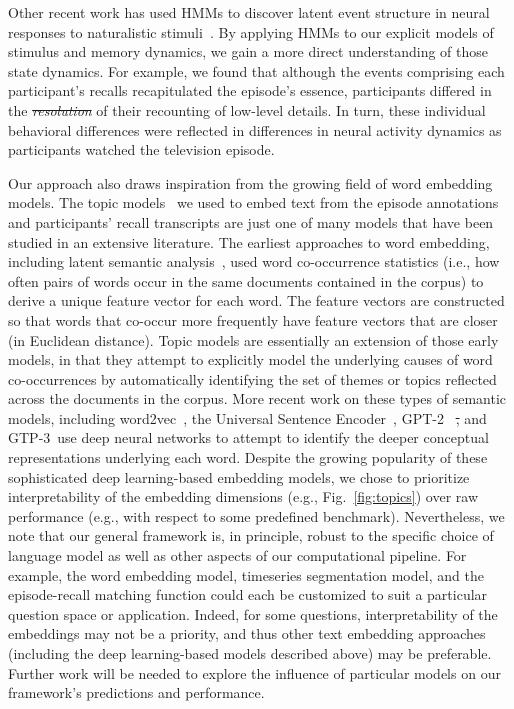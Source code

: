 \documentclass[10pt]{article}
\renewcommand{\includegraphics}[2][]{} %
\providecommand{\DIFaddtex}[1]{{\protect\color{blue}\uwave{#1}}} %
\providecommand{\DIFdeltex}[1]{{\protect\color{red}\sout{#1}}}                      %
\providecommand{\DIFaddbegin}{} %
\providecommand{\DIFaddend}{} %
\providecommand{\DIFdelbegin}{} %
\providecommand{\DIFdelend}{} %
\providecommand{\DIFadd}[1]{\texorpdfstring{\DIFaddtex{#1}}{#1}} %
\providecommand{\DIFdel}[1]{\texorpdfstring{\DIFdeltex{#1}}{}} %
\newcommand{\DIFscaledelfig}{0.5}
\newlength{\DIFdelgraphicswidth} %
\newlength{\DIFdelgraphicsheight} %
\newcommand{\DIFaddincludegraphics}[2][]{{\color{blue}\fbox{\DIFOincludegraphics[#1]{#2}}}} %
\newcommand{\DIFdelincludegraphics}[2][]{%
\sbox{\DIFdelgraphicsbox}{\DIFOincludegraphics[#1]{#2}}%
\settoboxwidth{\DIFdelgraphicswidth}{\DIFdelgraphicsbox} %
\settoboxtotalheight{\DIFdelgraphicsheight}{\DIFdelgraphicsbox} %
\scalebox{\DIFscaledelfig}{%
\parbox[b]{\DIFdelgraphicswidth}{\usebox{\DIFdelgraphicsbox}\\[-\baselineskip] \rule{\DIFdelgraphicswidth}{0em}}\llap{\resizebox{\DIFdelgraphicswidth}{\DIFdelgraphicsheight}{%
\setlength{\unitlength}{\DIFdelgraphicswidth}%
\begin{picture}(1,1)%
\thicklines\linethickness{2pt} %
{\color[rgb]{1,0,0}\put(0,0){\framebox(1,1){}}}%
{\color[rgb]{1,0,0}\put(0,0){\line( 1,1){1}}}%
{\color[rgb]{1,0,0}\put(0,1){\line(1,-1){1}}}%
\end{picture}%
}\hspace*{3pt}}} %
} %
\DeclareRobustCommand{\DIFaddbegin}{\DIFOaddbegin \let\includegraphics\DIFaddincludegraphics} %
\DeclareRobustCommand{\DIFaddend}{\DIFOaddend \let\includegraphics\DIFOincludegraphics} %
\DeclareRobustCommand{\DIFdelbegin}{\DIFOdelbegin \let\includegraphics\DIFdelincludegraphics} %
\DeclareRobustCommand{\DIFdelend}{\DIFOaddend \let\includegraphics\DIFOincludegraphics} %
\begin{document}
Other recent work has used HMMs to discover latent event structure in neural responses to naturalistic stimuli~\citep{BaldEtal17}.  By applying HMMs to our explicit models of stimulus and memory dynamics, we gain a more direct understanding of those state dynamics.  For example, we found that although the events comprising each participant's recalls recapitulated the episode's essence, participants differed in the \DIFdelbegin \textit{\DIFdel{resolution}} %
\DIFdelend \DIFaddbegin \DIFadd{resolution }\DIFaddend of their recounting of low-level details.  In turn, these individual behavioral differences were reflected in differences in neural activity dynamics as participants watched the television episode.

Our approach also draws inspiration from the growing field of word embedding models.  The topic models~\citep{BleiEtal03} we used to embed text from the episode annotations and participants' recall transcripts are just one of many models that have been studied in an extensive literature.  The earliest approaches to word embedding, including latent
semantic analysis~\citep{LandDuma97}, used word co-occurrence statistics (i.e., how often pairs of words occur in the same documents contained in the corpus) to derive a unique feature vector for each word.  The feature vectors are constructed so that words that co-occur more frequently have feature vectors that are closer (in Euclidean distance).  Topic models are essentially an extension of those early models, in that they attempt to explicitly model the underlying causes of word co-occurrences by automatically identifying the set of themes or topics reflected across the documents in the corpus.  More recent work on these types of semantic models, including word2vec~\citep{MikoEtal13a}, the Universal Sentence Encoder~\citep{CerEtal18}, \DIFaddbegin \DIFadd{and Generative Pre-trained Transformers (e.g., }\DIFaddend GPT-2~\citep{RadfEtal19} \DIFdelbegin \DIFdel{, }\DIFdelend and GTP-3~\citep{BrowEtal20}\DIFaddbegin \DIFadd{) }\DIFaddend use deep neural networks to attempt to identify the deeper conceptual representations underlying each word.  Despite the growing popularity of these sophisticated deep learning-based embedding models, we chose to prioritize interpretability of the embedding dimensions (e.g., Fig.~\ref{fig:topics}) over raw performance (e.g., with respect to some predefined benchmark).  Nevertheless, we note that our general framework is, in principle, robust to the specific choice of language model as well as other aspects of our computational pipeline.  For example, the word embedding model, timeseries segmentation model, and the episode-recall matching function could each be customized to suit a particular question space or application.  Indeed, for some questions, interpretability of the embeddings may not be a priority, and thus other text embedding approaches (including the deep learning-based models described above) may be preferable.  Further work will be needed to explore the influence of particular models on our framework's predictions and performance.
\end{document}
